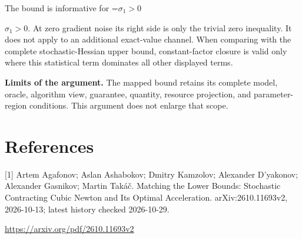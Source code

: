 \documentclass[10pt,a4paper]{article}
\newcommand{\AtlasMath}[1]{\par\begingroup\centering\setbox0=\hbox{$\displaystyle #1$}\ifdim\wd0>1.4\linewidth\typeout{ATLAS WIDE FORMULA: \the\wd0}\fi\ifdim\wd0>\linewidth\resizebox{\linewidth}{!}{\box0}\else\box0\fi\par\endgroup}
\newcommand{\AtlasInlineMath}[1]{\begingroup\setbox0=\hbox{$#1$}\ifdim\wd0>.4\linewidth\endgroup\AtlasMath{#1}\else\endgroup$#1$\fi}
\begin{document}
The bound is informative for \AtlasInlineMath{\sigma_1>0}. At zero gradient noise its right side is only the trivial zero inequality. It does not apply to an additional exact-value channel. When comparing with the complete stochastic-Hessian upper bound, constant-factor closure is valid only where this statistical term dominates all other displayed terms.

\textbf{Limits of the argument.} The mapped bound retains its complete model, oracle, algorithm view, guarantee, quantity, resource projection, and parameter-region conditions. This argument does not enlarge that scope.

\section{References}
[1] Artem Agafonov; Aslan Ashabokov; Dmitry Kamzolov; Alexander D'yakonov; Alexander Gasnikov; Martin Takáč. Matching the Lower Bounds: Stochastic Contracting Cubic Newton and Its Optimal Acceleration. arXiv:2610.11693v2, 2026-10-13; latest history checked 2026-10-29.

\url{https://arxiv.org/pdf/2610.11693v2}
\end{document}
